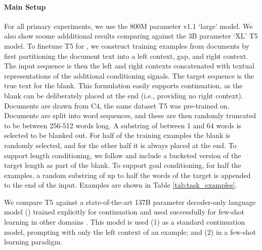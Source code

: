 \paragraph{Main Setup}
For all primary experiments, we use the 800M parameter v1.1 `large' model.
We also show soome addditional results comparing against the 3B parameter `XL' T5 model.
To finetune T5 for \FitB, we construct training examples from documents by first partitioning the document text into a left context, gap, and right context.
The input sequence is then the left and right contexts concatenated with textual representations of the additional conditioning signals.
The target sequence is the true text for the blank.
This formulation easily supports continuation, as the blank can be deliberately placed at the end (i.e., providing no right context).
Documents are drawn from C4, the same dataset T5 was pre-trained on.
Documents are split into word sequences, and these are then randomly truncated to be between 256-512 words long.
A substring of between 1 and 64 words is selected to be blanked out.
For half of the training examples the blank is randomly selected, and for the other half it is always placed at the end.
To support length conditioning, we follow \citet{roberts2020exploring} and include a bucketed version of the target length as part of the blank.
To support goal conditioning, for half the examples, a random substring of up to half the words of the target is appended to the end of the input.
Examples are shown in Table \ref{tab:task_examples}.

We compare T5 against a state-of-the-art 137B parameter decoder-only language model (\LLM{}) trained explicitly for continuation and used successfully for few-shot learning in other domains \citep{austin2021program,reif2021recipe}.
This model is used (1) as a standard continuation model, prompting with only the left context of an example; and (2) in a few-shot learning paradigm.

